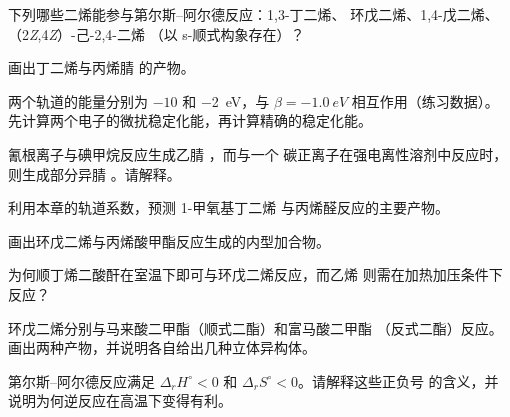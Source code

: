 \begin{exercise}[$\star$]\label{exo:b2:frontier-orbitals:3}
下列哪些二烯能参与第尔斯–阿尔德反应：1,3-丁二烯、
环戊二烯、1,4-戊二烯、（2\textit{Z},4\textit{Z}）-己-2,4-二烯
（以 s-顺式构象存在）？
\end{exercise}

\begin{exercise}[$\star$]\label{exo:b2:frontier-orbitals:4}
画出丁二烯与丙烯腈  的产物。
\end{exercise}

\begin{exercise}[$\star\star$]\label{exo:b2:frontier-orbitals:5}
两个轨道的能量分别为 $-10$ 和 \qty{-2}{eV}，与 $\beta = \qty{-1.0}{eV}$ 相互作用（练习数据）。
先计算两个电子的微扰稳定化能，再计算精确的稳定化能。
\end{exercise}

\begin{exercise}[$\star\star$]\label{exo:b2:frontier-orbitals:6}
氰根离子与碘甲烷反应生成乙腈 ，而与一个
碳正离子在强电离性溶剂中反应时，则生成部分异腈 。请解释。
\end{exercise}

\begin{exercise}[$\star\star$]\label{exo:b2:frontier-orbitals:7}
利用本章的轨道系数，预测 1-甲氧基丁二烯
与丙烯醛反应的主要产物。
\end{exercise}

\begin{exercise}[$\star\star$]\label{exo:b2:frontier-orbitals:8}
画出环戊二烯与丙烯酸甲酯反应生成的内型加合物。
\end{exercise}

\begin{exercise}[$\star\star$]\label{exo:b2:frontier-orbitals:9}
为何顺丁烯二酸酐在室温下即可与环戊二烯反应，而乙烯
则需在加热加压条件下反应？
\end{exercise}

\begin{exercise}[$\star\star\star$]\label{exo:b2:frontier-orbitals:10}
环戊二烯分别与马来酸二甲酯（顺式二酯）和富马酸二甲酯
（反式二酯）反应。画出两种产物，并说明各自给出几种立体异构体。
\end{exercise}

\begin{exercise}[$\star\star\star$]\label{exo:b2:frontier-orbitals:11}
第尔斯–阿尔德反应满足 $\Delta_r H^\circ < 0$ 和 $\Delta_r S^\circ < 0$。请解释这些正负号
的含义，并说明为何逆反应在高温下变得有利。
\end{exercise}

